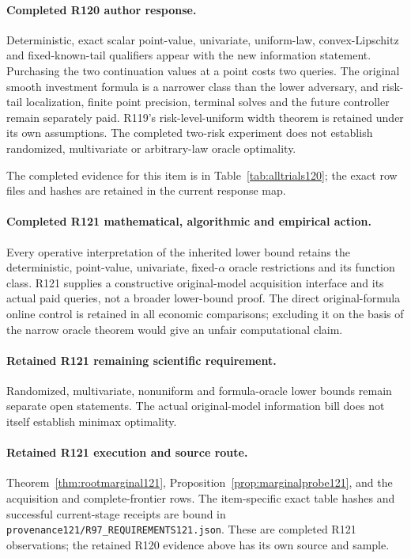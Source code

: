 \paragraph{Completed R120 author response.}
Deterministic, exact scalar point-value, univariate, uniform-law, convex-Lipschitz and fixed-known-tail qualifiers appear with the new information statement. Purchasing the two continuation values at a point costs two queries. The original smooth investment formula is a narrower class than the lower adversary, and risk-tail localization, finite point precision, terminal solves and the future controller remain separately paid. R119's risk-level-uniform width theorem is retained under its own assumptions. The completed two-risk experiment does not establish randomized, multivariate or arbitrary-law oracle optimality.

The completed evidence for this item is in Table~\ref{tab:alltrials120}; the exact row files and hashes are retained in the current response map.

\paragraph{Completed R121 mathematical, algorithmic and empirical action.}
Every operative interpretation of the inherited lower bound retains the deterministic, point-value, univariate, fixed-$\alpha$ oracle restrictions and its function class. R121 supplies a constructive original-model acquisition interface and its actual paid queries, not a broader lower-bound proof. The direct original-formula online control is retained in all economic comparisons; excluding it on the basis of the narrow oracle theorem would give an unfair computational claim.

\paragraph{Retained R121 remaining scientific requirement.}
Randomized, multivariate, nonuniform and formula-oracle lower bounds remain separate open statements. The actual original-model information bill does not itself establish minimax optimality.

\paragraph{Retained R121 execution and source route.}
Theorem~\ref{thm:rootmarginal121}, Proposition~\ref{prop:marginalprobe121}, and the acquisition and complete-frontier rows.
The item-specific exact table hashes and successful current-stage receipts are bound in \nolinkurl{provenance121/R97_REQUIREMENTS121.json}. These are completed R121 observations; the retained R120 evidence above has its own source and sample.
